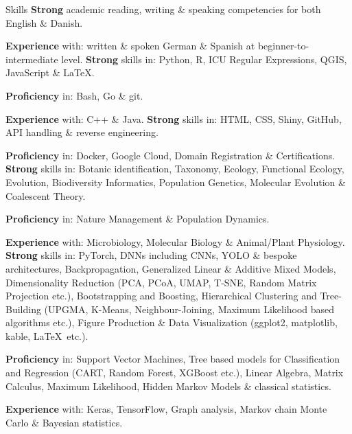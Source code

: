 
\begin{rubric}{Skills}
%
	\textbf{Strong} academic reading, writing \& speaking competencies for both English \& Danish.\par
    \textbf{Experience} with: 
    written \& spoken German \& Spanish at beginner-to-intermediate level.
%
%
	\textbf{Strong} skills in:
    Python, R, ICU Regular Expressions, QGIS, JavaScript \& \LaTeX.\par
    \textbf{Proficiency} in:
    Bash, Go \& git.\par
    \textbf{Experience} with:
    C++ \& Java.
%
%
	\textbf{Strong} skills in:
    HTML, CSS, Shiny, GitHub, API handling \& reverse engineering.\par 
    \textbf{Proficiency} in:
    Docker, Google Cloud, Domain Registration \& Certifications.
%
%
    \textbf{Strong} skills in:
    Botanic identification, Taxonomy, Ecology, Functional Ecology, Evolution, Biodiversity Informatics, Population Genetics, Molecular Evolution \& Coalescent Theory.\par
    \textbf{Proficiency} in:
    Nature Management \& Population Dynamics.\par
    \textbf{Experience} with:
     Microbiology, Molecular Biology \& Animal/Plant Physiology.
%
%
    \textbf{Strong} skills in:
    PyTorch, DNNs including CNNs, YOLO \& bespoke architectures, Backpropagation, Generalized Linear \& Additive Mixed Models, Dimensionality Reduction (PCA, PCoA, UMAP, T-SNE, Random Matrix Projection etc.), Bootstrapping and Boosting, Hierarchical Clustering and Tree-Building (UPGMA, K-Means, Neighbour-Joining, Maximum Likelihood based algorithms etc.), Figure Production \& Data Visualization (ggplot2, matplotlib, kable, \LaTeX\, etc.).\par
    \textbf{Proficiency} in:
    Support Vector Machines, Tree based models for Classification and Regression (CART, Random Forest, XGBoost etc.), Linear Algebra, Matrix Calculus, Maximum Likelihood, Hidden Markov Models \& classical statistics.\par
    \textbf{Experience} with:
    Keras, TensorFlow, Graph analysis, Markov chain Monte Carlo \& Bayesian statistics.
\end{rubric}
